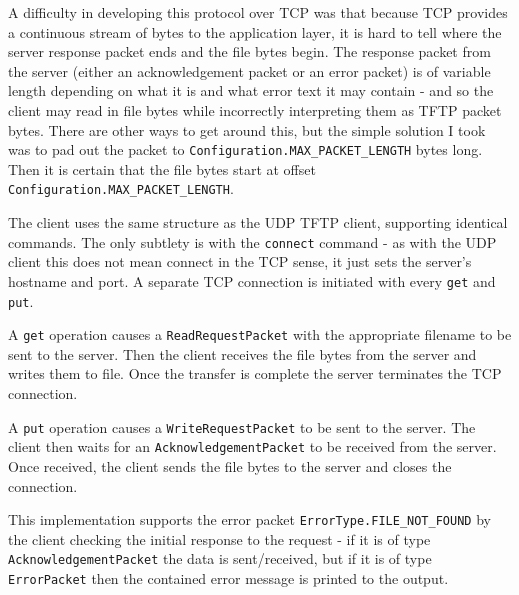 \documentclass[a4paper]{article}
\newcommand{\code}{\texttt}
\begin{document}
A difficulty in developing this protocol over TCP was that because TCP provides a continuous stream of bytes to the application layer, it is hard to tell where the server response packet ends and the file bytes begin. The response packet from the server (either an acknowledgement packet or an error packet) is of variable length depending on what it is and what error text it may contain - and so the client may read in file bytes while incorrectly interpreting them as TFTP packet bytes. There are other ways to get around this, but the simple solution I took was to pad out the packet to \code{Configuration.MAX\_PACKET\_LENGTH} bytes long. Then it is certain that the file bytes start at offset \code{Configuration.MAX\_PACKET\_LENGTH}.

The client uses the same structure as the UDP TFTP client, supporting identical commands. The only subtlety is with the \code{connect} command - as with the UDP client this does not mean connect in the TCP sense, it just sets the server's hostname and port. A separate TCP connection is initiated with every \code{get} and \code{put}.

A \code{get} operation causes a \code{ReadRequestPacket} with the appropriate filename to be sent to the server. Then the client receives the file bytes from the server and writes them to file. Once the transfer is complete the server terminates the TCP connection.

A \code{put} operation causes a \code{WriteRequestPacket} to be sent to the server. The client then waits for an \code{AcknowledgementPacket} to be received from the server. Once received, the client sends the file bytes to the server and closes the connection. 

This implementation supports the error packet \code{ErrorType.FILE\_NOT\_FOUND} by the client checking the initial response to the request - if it is of type \code{AcknowledgementPacket} the data is sent/received, but if it is of type \code{ErrorPacket} then the contained error message is printed to the output.
\end{document}
